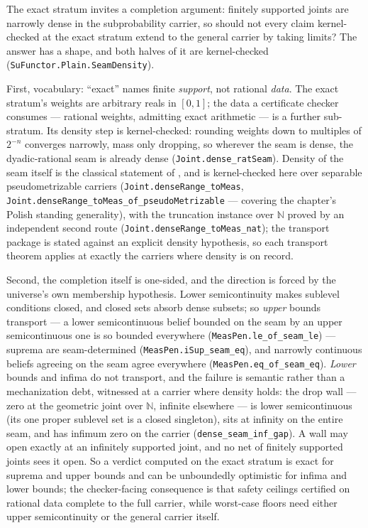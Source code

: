 \begin{remark}
\label{rem:su-density-completion}
The exact stratum invites a completion argument: finitely supported
joints are narrowly dense in the subprobability carrier, so should
not every claim kernel-checked at the exact stratum extend to the
general carrier by taking limits?  The answer has a shape, and both
halves of it are kernel-checked
(\texttt{SuFunctor.Plain.SeamDensity}).

First, vocabulary: ``exact'' names finite \emph{support}, not
rational \emph{data}.  The exact stratum's weights are arbitrary
reals in $[0,1]$; the data a certificate checker consumes ---
rational weights, admitting exact arithmetic --- is a further
sub-stratum.  Its density step is kernel-checked: rounding weights
down to multiples of $2^{-n}$ converges narrowly, mass only
dropping, so wherever the seam is dense, the dyadic-rational seam
is already dense (\texttt{Joint.dense\_ratSeam}).  Density of the
seam itself is the classical statement of
\cite[Thm.~II.6.3]{parthasarathy67}, and is kernel-checked here over
separable pseudometrizable carriers
(\texttt{Joint.denseRange\_toMeas},
\texttt{Joint.denseRange\_toMeas\_of\_pseudoMetrizable} --- covering
the chapter's Polish standing generality), with the truncation
instance over $\mathbb{N}$ proved by an independent second route
(\texttt{Joint.denseRange\_toMeas\_nat}); the transport package is
stated against an explicit density hypothesis, so each transport
theorem applies at exactly the carriers where density is on record.

Second, the completion itself is one-sided, and the direction is
forced by the universe's own membership hypothesis.  Lower
semicontinuity makes sublevel conditions closed, and closed sets
absorb dense subsets; so \emph{upper} bounds transport --- a lower
semicontinuous belief bounded on the seam by an upper
semicontinuous one is so bounded everywhere
(\texttt{MeasPen.le\_of\_seam\_le}) --- suprema are seam-determined
(\texttt{MeasPen.iSup\_seam\_eq}), and narrowly continuous
beliefs agreeing on the seam agree everywhere
(\texttt{MeasPen.eq\_of\_seam\_eq}).  \emph{Lower} bounds and
infima do not transport, and the failure is semantic rather than a
mechanization debt, witnessed at a carrier where density holds: the
drop wall --- zero at the geometric joint over $\mathbb{N}$,
infinite elsewhere --- is lower semicontinuous (its one proper
sublevel set is a closed singleton), sits at infinity on the entire
seam, and has infimum zero on the carrier
(\texttt{dense\_seam\_inf\_gap}).  A wall may open exactly at an
infinitely supported joint, and no net of finitely supported joints
sees it open.  So a verdict computed on the exact stratum is exact
for suprema and upper bounds and can be unboundedly optimistic for
infima and lower bounds; the checker-facing consequence is that
safety ceilings certified on rational data complete to the full
carrier, while worst-case floors need either upper semicontinuity
or the general carrier itself.


\end{remark}
